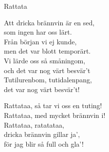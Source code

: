\begin{song}{Rattata}


    	
	Att dricka brännvin är en sed,\\
	som ingen har oss lärt.\\
	Från början vi ej kunde,\\
	men det var blott temporärt.\\
	Vi lärde oss så småningom,\\
	och det var nog värt besvär't\\
	Tutilurenbom, tutidalenpang,\\
	det var nog värt besvär't!\\
	\begin{repetition}
		Rattataa, så tar vi oss en tuting!\\
		Rattataa, med mycket brännvin i!\\
		Rattataa, ratatataa,\\
		dricka brännvin gillar ja',\\
		för jag blir så full och gla'!
	\end{repetition}
	
\end{song}
